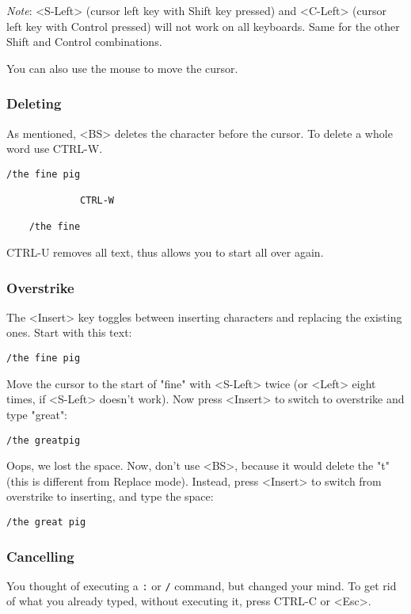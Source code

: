 \emph{Note}:
<S-Left> (cursor left key with Shift key pressed) and <C-Left> (cursor left key with Control pressed) will not work on all keyboards.
Same for the other Shift and Control combinations.

You can also use the mouse to move the cursor.
\subsubsection{Deleting}
As mentioned, <BS> deletes the character before the cursor.  To delete a whole
word use CTRL-W.

\begin{Verbatim}[samepage=true]
    /the fine pig 

             CTRL-W

    /the fine 
\end{Verbatim}

CTRL-U removes all text, thus allows you to start all over again.
\subsubsection{Overstrike}
The <Insert> key toggles between inserting characters and replacing the existing ones.
Start with this text:

\begin{Verbatim}[samepage=true]
    /the fine pig 
\end{Verbatim}

Move the cursor to the start of "fine" with <S-Left> twice (or <Left> eight times, if <S-Left> doesn't work).
Now press <Insert> to switch to overstrike and type "great":

\begin{Verbatim}[samepage=true]
    /the greatpig 
\end{Verbatim}

Oops, we lost the space.
Now, don't use <BS>, because it would delete the "t" (this is different from Replace mode).
Instead, press <Insert> to switch from overstrike to inserting, and type the space:

\begin{Verbatim}[samepage=true]
    /the great pig 
\end{Verbatim}

\subsubsection{Cancelling}
You thought of executing a \verb!:! or \verb!/! command, but changed your mind.
To get rid of what you already typed, without executing it, press CTRL-C or <Esc>.

